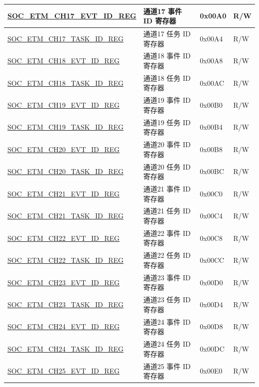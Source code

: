 \begin{longtable}{ | p{6cm} | p{6.2cm} | p{1.3cm} | p{2cm} | }
\hyperref[regdesc:SOCETMCHNEVTIDREG]{SOC\_ETM\_CH17\_EVT\_ID\_REG} & 通道17 事件 ID 寄存器 & 0x00A0 & R/W \\ \hline
\hyperref[regdesc:SOCETMCHNTASKIDREG]{SOC\_ETM\_CH17\_TASK\_ID\_REG} & 通道17 任务 ID 寄存器 & 0x00A4 & R/W \\ \hline
\hyperref[regdesc:SOCETMCHNEVTIDREG]{SOC\_ETM\_CH18\_EVT\_ID\_REG} & 通道18 事件 ID 寄存器 & 0x00A8 & R/W \\ \hline
\hyperref[regdesc:SOCETMCHNTASKIDREG]{SOC\_ETM\_CH18\_TASK\_ID\_REG} & 通道18 任务 ID 寄存器 & 0x00AC & R/W \\ \hline
\hyperref[regdesc:SOCETMCHNEVTIDREG]{SOC\_ETM\_CH19\_EVT\_ID\_REG} & 通道19 事件 ID 寄存器 & 0x00B0 & R/W \\ \hline
\hyperref[regdesc:SOCETMCHNTASKIDREG]{SOC\_ETM\_CH19\_TASK\_ID\_REG} & 通道19 任务 ID 寄存器 & 0x00B4 & R/W \\ \hline
\hyperref[regdesc:SOCETMCHNEVTIDREG]{SOC\_ETM\_CH20\_EVT\_ID\_REG} & 通道20 事件 ID 寄存器 & 0x00B8 & R/W \\ \hline
\hyperref[regdesc:SOCETMCHNTASKIDREG]{SOC\_ETM\_CH20\_TASK\_ID\_REG} & 通道20 任务 ID 寄存器 & 0x00BC & R/W \\ \hline
\hyperref[regdesc:SOCETMCHNEVTIDREG]{SOC\_ETM\_CH21\_EVT\_ID\_REG} & 通道21 事件 ID 寄存器 & 0x00C0 & R/W \\ \hline
\hyperref[regdesc:SOCETMCHNTASKIDREG]{SOC\_ETM\_CH21\_TASK\_ID\_REG} & 通道21 任务 ID 寄存器 & 0x00C4 & R/W \\ \hline
\hyperref[regdesc:SOCETMCHNEVTIDREG]{SOC\_ETM\_CH22\_EVT\_ID\_REG} & 通道22 事件 ID 寄存器 & 0x00C8 & R/W \\ \hline
\hyperref[regdesc:SOCETMCHNTASKIDREG]{SOC\_ETM\_CH22\_TASK\_ID\_REG} & 通道22 任务 ID 寄存器 & 0x00CC & R/W \\ \hline
\hyperref[regdesc:SOCETMCHNEVTIDREG]{SOC\_ETM\_CH23\_EVT\_ID\_REG} & 通道23 事件 ID 寄存器 & 0x00D0 & R/W \\ \hline
\hyperref[regdesc:SOCETMCHNTASKIDREG]{SOC\_ETM\_CH23\_TASK\_ID\_REG} & 通道23 任务 ID 寄存器 & 0x00D4 & R/W \\ \hline
\hyperref[regdesc:SOCETMCHNEVTIDREG]{SOC\_ETM\_CH24\_EVT\_ID\_REG} & 通道24 事件 ID 寄存器 & 0x00D8 & R/W \\ \hline
\hyperref[regdesc:SOCETMCHNTASKIDREG]{SOC\_ETM\_CH24\_TASK\_ID\_REG} & 通道24 任务 ID 寄存器 & 0x00DC & R/W \\ \hline
\hyperref[regdesc:SOCETMCHNEVTIDREG]{SOC\_ETM\_CH25\_EVT\_ID\_REG} & 通道25 事件 ID 寄存器 & 0x00E0 & R/W \\ \hline

\end{longtable}

